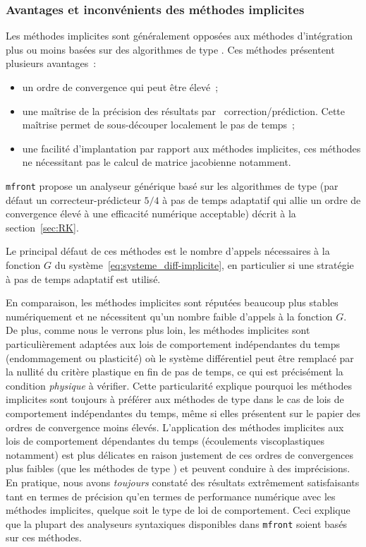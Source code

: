 \documentclass[rectoverso,pleiades,pstricks,leqno,anti]{texmf/note_technique_2010}
\newcommand{\mfront}{\texttt{mfront}}
\begin{document}
\subsubsection{Avantages et inconvénients des méthodes implicites} Les
méthodes implicites sont généralement opposées aux méthodes
d'intégration plus ou moins basées sur des algorithmes de type
. Ces méthodes présentent plusieurs avantages~:
\begin{itemize}
\item un ordre de convergence qui peut être élevé~;
\item une maîtrise de la précision des résultats par
  \og~correction/prédiction\fg{}. Cette maîtrise permet de
  sous-découper localement le pas de temps~;
\item une facilité d'implantation par rapport aux méthodes implicites,
  ces méthodes ne nécessitant pas le calcul de matrice jacobienne
  notamment.
\end{itemize}

\mfront{} propose un analyseur générique basé sur les algorithmes de
type  (par défaut un correcteur-prédicteur \(5/4\) à
pas de temps adaptatif qui allie un ordre de convergence élevé à une
efficacité numérique acceptable) décrit à la section~\ref{sec:RK}.

Le principal défaut de ces méthodes est le nombre d'appels nécessaires à
la fonction \(G\) du système~\eqref{eq:systeme_diff-implicite}, en
particulier si une stratégie à pas de temps adaptatif est utilisé.

En comparaison, les méthodes implicites sont réputées beaucoup plus
stables numériquement et ne nécessitent qu'un nombre faible d'appels à
la fonction \(G\). De plus, comme nous le verrons plus loin, les
méthodes implicites sont particulièrement adaptées aux lois de
comportement indépendantes du temps (endommagement ou plasticité) où
le système différentiel peut être remplacé par la nullité du critère
plastique en fin de pas de temps, ce qui est précisément la condition
{\em physique} à vérifier. Cette particularité explique pourquoi les
méthodes implicites sont toujours à préférer aux méthodes de type
 dans le cas de lois de comportement indépendantes du
temps, même si elles présentent sur le papier des ordres de
convergence moins élevés.  L'application des méthodes implicites aux
lois de comportement dépendantes du temps (écoulements viscoplastiques
notamment) est plus délicates en raison justement de ces ordres de
convergences plus faibles (que les méthodes de type )
et peuvent conduire à des imprécisions. En pratique, nous avons {\em
  toujours} constaté des résultats extrêmement satisfaisants tant en
termes de précision qu'en termes de performance numérique avec les
méthodes implicites, quelque soit le type de loi de comportement. Ceci
explique que la plupart des analyseurs syntaxiques disponibles dans
\mfront{} soient basés sur ces méthodes.
\end{document}
